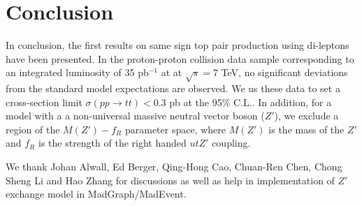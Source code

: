 \section{Conclusion}
\label{sec:conclusion}
In conclusion, the first results on same sign top pair production using 
di-leptons have been presented. 
In the proton-proton collision data sample corresponding to an 
integrated luminosity of 35 pb$^{-1}$ at at $\sqrt{s} = 7 $ TeV, 
no significant deviations from the standard model expectations are observed. 
We us these data to set a cross-section limit $\sigma(pp \to tt) < 0.3$ pb at the 95\% C.L..
In addition, for a model with a 
a non-universal massive neutral vector boson ($Z'$), we exclude 
a region of the $M(Z')-f_R$ parameter space, where $M(Z')$ is the mass of the $Z'$ 
and $f_R$ is the strength of the right handed $utZ'$ coupling.



\ack

We thank Johan Alwall, Ed Berger, Qing-Hong Cao, Chuan-Ren Chen, Chong Sheng Li and Hao Zhang for 
discussions as well as help in implementation of $Z'$ exchange model in MadGraph/MadEvent. 


